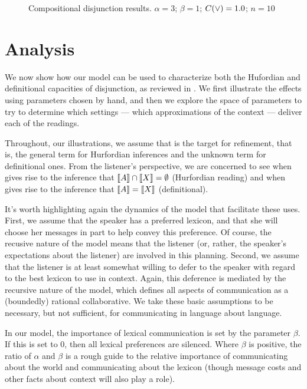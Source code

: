 \documentclass{article}
\begin{document}
\begin{figure}[tp]
\begin{subfigure}{0.48\textwidth}
  \end{subfigure}
  \caption{Compositional disjunction results. $\alpha = 3$; $\beta = 1$; $C(\vee) = 1.0$; $n = 10$}
  \label{fig:compdisj}
\end{figure}


\section{Analysis}\label{sec:analysis}

We now show how our model can be used to characterize both the
Hufordian and definitional capacities of disjunction, as reviewed in
. We first illustrate the effects using parameters
chosen by hand, and then we explore the space of parameters to try to
determine which settings --- which approximations of the context ---
deliver each of the readings. 

Throughout, our illustrations, we assume that  is the target
for refinement, that is, the general term for Hurfordian inferences
and the unknown term for definitional ones.  From the listener's
perspective, we are concerned to see when  gives rise to
the inference that $\llbracket A\rrbracket \cap \llbracket X\rrbracket = \emptyset$ (Hurfordian
reading) and when  gives rise to the inference that
$\llbracket A\rrbracket = \llbracket X\rrbracket$ (definitional).

It's worth highlighting again the dynamics of the model that
facilitate these uses. First, we assume that the speaker has a
preferred lexicon, and that she will choose her messages in part to
help convey this preference. Of course, the recusive nature of the
model means that the listener (or, rather, the speaker's expectations
about the listener) are involved in this planning. Second, we assume
that the listener is at least somewhat willing to defer to the speaker
with regard to the best lexicon to use in context. Again, this
deference is mediated by the recursive nature of the model, which
defines all aspects of communication as a (boundedly) rational
collaborative. We take these basic assumptions to be necessary, but
not sufficient, for communicating in language about language.

In our model, the importance of lexical communication is set by the
parameter $\beta$. If this is set to $0$, then all lexical preferences
are silenced. Where $\beta$ is positive, the ratio of $\alpha$ and
$\beta$ is a rough guide to the relative importance of communicating
about the world and communicating about the lexicon (though message
costs and other facts about context will also play a role).
\end{document}
